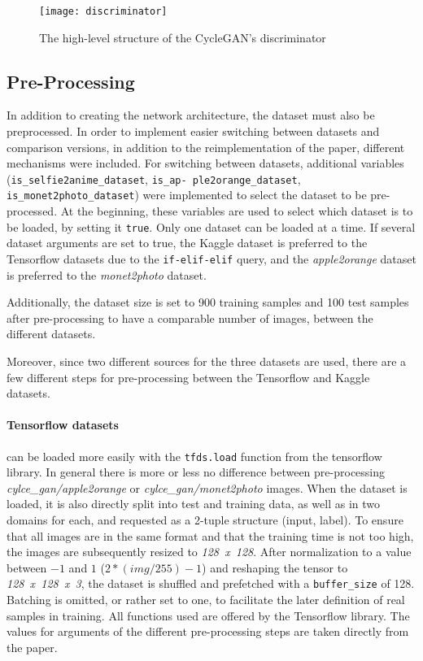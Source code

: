 \documentclass[fleqn,10pt]{SelfArx} %
\begin{document}
\begin{figure*}[htb] 
	\centering 
	\texttt{[image: discriminator]}
	\caption{The high-level structure of the Cycle\ac{GAN}'s discriminator \cite{Introduction-to-Cycle-GANs}}
	\label{fig:discriminator}
\end{figure*}

\subsection{Pre-Processing}
In addition to creating the network architecture, the dataset must also be preprocessed. In order to implement easier switching between datasets and comparison versions, in addition to the reimplementation of the paper, different mechanisms were included. For switching between datasets, additional variables (\texttt{is\_selfie2anime\_dataset}, \texttt{is\_ap- ple2orange\_dataset}, \texttt{is\_monet2photo\_dataset}) were implemented to select the dataset to be pre-processed. At the beginning, these variables are used to select which dataset is to be loaded, by setting it \texttt{true}. Only one dataset can be loaded at a time. If several dataset arguments are set to true, the Kaggle dataset is preferred to the Tensorflow datasets due to the \texttt{if-elif-elif} query, and the \textit{apple2orange} dataset is preferred to the \textit{monet2photo} dataset.

Additionally, the dataset size is set to 900 training samples and 100 test samples after pre-processing to have a comparable number of images, between the different datasets. 

Moreover, since two different sources for the three datasets are used, there are a few different steps for pre-processing between the Tensorflow and Kaggle datasets. 

\paragraph{Tensorflow datasets} can be loaded more easily with the \texttt{tfds.load} function from the tensorflow library. In general there is more or less no difference between pre-processing \textit{cylce\_gan/apple2orange} or \textit{cylce\_gan/monet2photo} images. When the dataset is loaded, it is also directly split into test and training data, as well as in two domains for each, and requested as a 2-tuple structure (input, label). To ensure that all images are in the same format and that the training time is not too high, the images are subsequently resized to \textit{128~x~128}. After normalization to a value between $-1$ and $1$ ($2 * (img / 255) - 1$) and reshaping the tensor to \textit{128~x~128~x~3}, the dataset is shuffled and prefetched with a \texttt{buffer\_size} of 128. Batching is omitted, or rather set to one, to facilitate the later definition of real samples in training. All functions used are offered by the Tensorflow library. The values for arguments of the different pre-processing steps are taken directly from the paper.~\cite{image-to-image-ccan}
\end{document}
